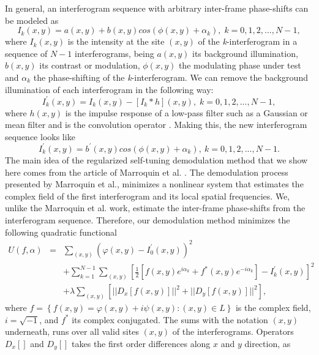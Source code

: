 In general, an interferogram sequence with arbitrary inter-frame phase-shifts
can be modeled as 
\begin{equation}
I_{k}(x,y)=a(x,y)+b(x,y)cos(\phi(x,y)+\alpha_{k}),\; k=0,1,2,...,N-1,\label{eq:
Ik}
\end{equation}
where $I_{k}(x,y)$ is the intensity at the site $(x,y)$ of the
\emph{k}-interferogram in a sequence of $N-1$ interferograms, being
$a(x,y)$ its background illumination, $b(x,y)$ its contrast or modulation,
$\phi(x,y)$ the modulating phase under test and $\alpha_{k}$ the
phase-shifting of the \emph{k}-interferogram. We can remove the background
illumination of each interferogram in the following way: 
\begin{equation}
I_{k}^{'}(x,y)=I_{k}(x,y)-[I_{k}*h](x,y),\; k=0,1,2,...,N-1,\label{eq:I'}
\end{equation}
where $h(x,y)$ is the impulse response of a low-pass filter such
as a Gaussian or mean filter and \textasteriskcentered{} is the convolution
operator \cite{Jahne}. Making this, the new interferogram sequence looks
like 
\begin{equation}
I_{k}^{'}(x,y)=b^{'}(x,y)cos(\phi(x,y)+\alpha_{k}),\: k=0,1,2,...,N-1.\label{eq:
I'2}
\end{equation}
The main idea of the regularized self-tuning demodulation method that
we show here comes from the article of Marroquin et al. \cite{RQF}.
The demodulation process presented by Marroquin et al., minimizes
a nonlinear system that estimates the complex field of the first interferogram
and its local spatial frequencies. We, unlike the Marroquin et al.
work, estimate the inter-frame phase-shifts from the interferogram
sequence. Therefore, our demodulation method minimizes the following
quadratic functional
\begin{eqnarray}
U(f,\alpha) & = & \sum_{(x,y)}(\varphi(x,y)-I_{0}^{'}(x,y))^{2}\nonumber \\
& &+\sum_{k=1}^{N-1}
\sum_{(x,y)}[\frac{1}{2}[f(x,y)e^{i\alpha_{k}}+f^{*}(x,y)e^{-i\alpha_{k}}]-I_{k}
^{'}(x,y)]^{2}\label{eq:U}\\
 &  & +\lambda\sum_{(x,y)}[||D_{x}[f(x,y)]||^{2}+||D_{y}[f(x,y)]||^{2}],\nonumber 
\end{eqnarray}
where $f=\left\{ f(x,y)=\varphi(x,y)+i\psi(x,y):(x,y)\in L\right\} $
is the complex field, $i=\sqrt{-1}$, and $f^{*}$ its complex conjugated.
The sums with the notation $(x,y)$ underneath, runs over all valid
sites $(x,y)$ of the interferograms. Operators $D_{x}[]$ and $D_{y}[]$
takes the first order differences along $x$ and $y$ direction, as
